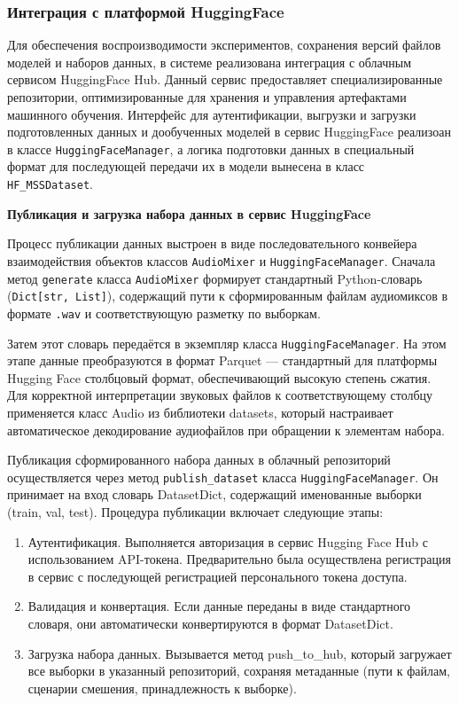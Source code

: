 \documentclass[14pt]{extarticle}
\begin{document}
\subsubsection{Интеграция с платформой HuggingFace}

Для обеспечения воспроизводимости экспериментов, сохранения версий файлов моделей и наборов данных,
в системе реализована интеграция с облачным сервисом HuggingFace Hub.
Данный сервис предоставляет специализированные репозитории, оптимизированные для хранения и управления артефактами машинного обучения.
Интерфейс для аутентификации, выгрузки и загрузки подготовленных данных и дообученных моделей в сервис HuggingFace
реализоан в классе \texttt{HuggingFaceManager}, а логика подготовки данных в специальный формат
для последующей передачи их в модели вынесена в класс \texttt{HF\_MSSDataset}.

\par\textbf{Публикация и загрузка набора данных в сервис HuggingFace}
\label{sec:huggingface}

Процесс публикации данных выстроен в виде последовательного конвейера взаимодействия 
объектов классов \texttt{AudioMixer} и \texttt{HuggingFaceManager}.
Сначала метод \texttt{generate} класса \texttt{AudioMixer} формирует стандартный Python-словарь 
(\texttt{Dict[str, List]}), содержащий пути к сформированным файлам аудиомиксов в формате \texttt{.wav}
и соответствующую разметку по выборкам.

Затем этот словарь передаётся в экземпляр класса \texttt{HuggingFaceManager}.
На этом этапе данные преобразуются в формат Parquet --- стандартный для платформы 
Hugging Face столбцовый формат, обеспечивающий высокую степень сжатия. 
Для корректной интерпретации звуковых файлов к соответствующему столбцу применяется класс Audio 
из библиотеки datasets, который настраивает автоматическое декодирование аудиофайлов при обращении к элементам набора.  

Публикация сформированного набора данных в облачный репозиторий осуществляется через метод 
\texttt{publish\_dataset} класса \texttt{HuggingFaceManager}. Он принимает на вход словарь DatasetDict, 
содержащий именованные выборки (train, val, test).
Процедура публикации включает следующие этапы:
\begin{enumerate}[label=\arabic*)]
	\item Аутентификация. Выполняется авторизация в сервис Hugging Face Hub с использованием API-токена. Предварительно была 
	осуществлена регистрация в сервис с последующей регистрацией персонального токена доступа.
	\item Валидация и конвертация. Если данные переданы в виде стандартного словаря, они автоматически конвертируются в формат DatasetDict.
	\item Загрузка набора данных. Вызывается метод push\_to\_hub, который загружает все выборки в 
	указанный репозиторий, сохраняя метаданные (пути к файлам, сценарии смешения, принадлежность к выборке).
\end{enumerate}
\end{document}

